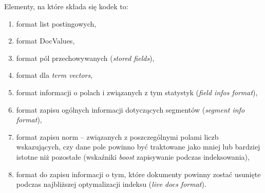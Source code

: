 Elementy, na które składa się kodek to:
\begin{enumerate}
 \item format list postingowych,
 \item format DocValues,
 \item format pól przechowywanych (\emph{stored fields}),
 \item format dla \emph{term vectors},
 \item format informacji o polach i związanych z tym statystyk (\emph{field infos format}),
 \item format zapisu ogólnych informacji dotyczących segmentów (\emph{segment info format}),
 \item format zapisu norm -- związanych z poszczególnymi polami liczb wskazujących, czy dane pole powinno być traktowane jako mniej lub bardziej istotne niż pozostałe (wskaźniki \emph{boost} zapisywanie podczas indeksowania),
 \item format do zapisu informacji o tym, które dokumenty powinny zostać usunięte podczas najbliższej optymalizacji indeksu (\emph{live docs format}).
\end{enumerate}
